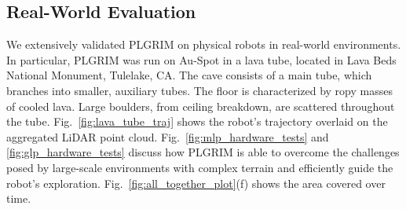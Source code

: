 \documentclass[letterpaper]{article} %
\newcommand{\note}[1]{{\color{red}#1 }}
\begin{document}





\subsection{Real-World Evaluation}
We extensively validated PLGRIM on physical robots in real-world environments. In particular, PLGRIM was run on Au-Spot in a lava tube, located in Lava Beds National Monument, Tulelake, CA. The cave consists of a main tube, which branches into smaller, auxiliary tubes. The floor is characterized by ropy masses of cooled lava. Large boulders, from ceiling breakdown, are scattered throughout the tube.
Fig.~\ref{fig:lava_tube_traj} shows the robot's trajectory overlaid on the aggregated LiDAR point cloud.
Fig.~\ref{fig:mlp_hardware_tests} and \ref{fig:glp_hardware_tests} discuss how PLGRIM is able to overcome the challenges posed by large-scale environments with complex terrain and efficiently guide the robot's exploration. Fig.~\ref{fig:all_together_plot}(f) shows the area covered over time.



\end{document}
